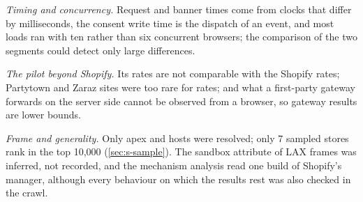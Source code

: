 \documentclass[preprint,11pt,authoryear,a4paper]{elsarticle}
\begin{document}
\emph{Timing and concurrency.} Request and banner times come from clocks that differ by milliseconds, the consent write time is the dispatch of an event, and most loads ran with ten rather than six concurrent browsers; the comparison of the two segments could detect only large differences.

\emph{The pilot beyond Shopify.} Its rates are not comparable with the Shopify rates; Partytown and Zaraz sites were too rare for rates; and what a first-party gateway forwards on the server side cannot be observed from a browser, so gateway results are lower bounds.

\emph{Frame and generality.} Only apex and  hosts were resolved; only 7 sampled stores rank in the top 10,000 (\ref{sec:s-sample}). The sandbox attribute of LAX frames was inferred, not recorded, and the mechanism analysis read one build of Shopify's manager, although every behaviour on which the results rest was also checked in the crawl.
\end{document}
